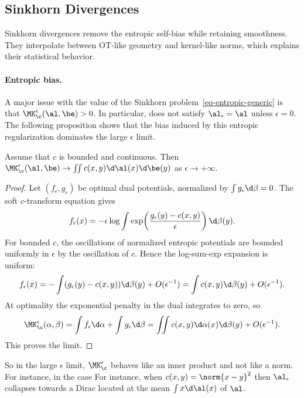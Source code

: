 \subsection{Sinkhorn Divergences}
\label{sec-sinkhorn-div}


Sinkhorn divergences remove the entropic self-bias while retaining smoothness. They interpolate between OT-like geometry and kernel-like norms, which explains their statistical behavior.

\paragraph{Entropic bias.}

A major issue with the value of the Sinkhorn problem~\eqref{eq-entropic-generic} is that $\MK_\c^\epsilon(\al,\be)>0$. In particular,
\eq{
	\al_\epsilon = \uargmin{\be} \MK_\c^\epsilon(\al,\be)
}
does not satisfy $\al_\epsilon=\al$ unless $\epsilon=0$. The following proposition shows that the bias induced by this entropic regularization dominates the large $\epsilon$ limit.

\begin{prop}
		Assume that $c$ is bounded and continuous. Then $\MK_\c^\epsilon(\al,\be) \rightarrow \iint c(x,y)\d\al(x)\d\be(y)$ as $\epsilon \rightarrow +\infty$.
\end{prop}
\begin{proof}
	Let $(f_\epsilon,g_\epsilon)$ be optimal dual potentials, normalized by $\int g_\epsilon\d\beta=0$. The soft $c$-transform equation gives
	\[
		f_\epsilon(x)
		=
		-\epsilon\log\int
		\exp\!\left(\frac{g_\epsilon(y)-c(x,y)}{\epsilon}\right)\d\beta(y).
	\]
	For bounded $c$, the oscillations of normalized entropic potentials are bounded uniformly in $\epsilon$ by the oscillation of $c$. Hence the log-sum-exp expansion is uniform:
	\[
		f_\epsilon(x)
		=
		-\int (g_\epsilon(y)-c(x,y))\d\beta(y)+O(\epsilon^{-1})
		=
		\int c(x,y)\d\beta(y)+O(\epsilon^{-1}).
	\]
	At optimality the exponential penalty in the dual integrates to zero, so
	\[
		\MK_\c^\epsilon(\alpha,\beta)
		=
		\int f_\epsilon\d\alpha+\int g_\epsilon\d\beta
		=
		\iint c(x,y)\d\alpha(x)\d\beta(y)+O(\epsilon^{-1}).
	\]
	This proves the limit.
\end{proof}

So in the large $\epsilon$ limit, $\MK_\c^\epsilon$ behaves like an inner product and not like a norm. For instance, in the case
For instance, when $c(x,y)=\norm{x-y}^2$ then $\al_\epsilon$ collapses towards a Dirac located at the mean $\int x \d\al(x)$ of $\al$.

